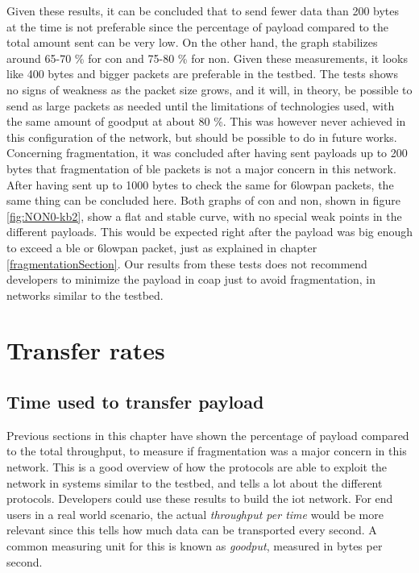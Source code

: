 \noindent Given these results, it can be concluded that to send fewer data than 200 bytes at the time is not preferable since the percentage of \gls{payload} compared to the total amount sent can be very low. On the other hand, the graph stabilizes around 65-70 \% for \gls{con} and 75-80 \% for \gls{non}. Given these measurements, it looks like 400 bytes and bigger packets are preferable in the testbed. The tests shows no signs of weakness as the packet size grows, and it will, in theory, be possible to send as large packets as needed until the limitations of technologies used, with the same amount of \gls{goodput} at about 80 \%. This was however never achieved in this configuration of the network, but should be possible to do in future works. Concerning fragmentation, it was concluded after having sent \glspl{payload} up to 200 bytes that fragmentation of \gls{ble} packets is not a major concern in this network. After having sent up to 1000 bytes to check the same for \gls{6lowpan} packets, the same thing can be concluded here. Both graphs of \gls{con} and \gls{non}, shown in figure \ref{fig:NON0-kb2}, show a flat and stable curve, with no special weak points in the different \glspl{payload}. This would be expected right after the \gls{payload} was big enough to exceed a \gls{ble} or \gls{6lowpan} packet, just as explained in chapter \ref{fragmentationSection}. Our results from these tests does not recommend developers to minimize the \gls{payload} in \gls{coap} just to avoid fragmentation, in networks similar to the testbed. 




\section{Transfer rates}

\subsection{Time used to transfer payload}

\noindent Previous sections in this chapter have shown the percentage of payload compared to the total throughput, to measure if fragmentation was a major concern in this network. This is a good overview of how the protocols are able to exploit the network in systems similar to the testbed, and tells a lot about the different protocols. Developers could use these results to build the \gls{iot} network. For end users in a real world scenario, the actual \textit{throughput per time} would be more relevant since this tells how much data can be transported every second. A common measuring unit for this is known as \textit{\gls{goodput}}, measured in bytes per second.  



